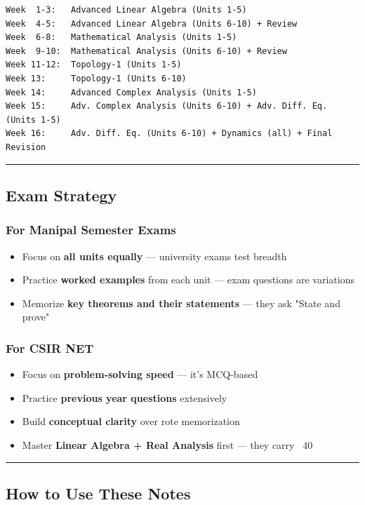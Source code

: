 \documentclass[12pt,a4paper,openany]{book}
\begin{document}
{\begin{verbatim}
Week  1-3:   Advanced Linear Algebra (Units 1-5)
Week  4-5:   Advanced Linear Algebra (Units 6-10) + Review
Week  6-8:   Mathematical Analysis (Units 1-5)
Week  9-10:  Mathematical Analysis (Units 6-10) + Review
Week 11-12:  Topology-1 (Units 1-5)
Week 13:     Topology-1 (Units 6-10)
Week 14:     Advanced Complex Analysis (Units 1-5)
Week 15:     Adv. Complex Analysis (Units 6-10) + Adv. Diff. Eq. (Units 1-5)
Week 16:     Adv. Diff. Eq. (Units 6-10) + Dynamics (all) + Final Revision
\end{verbatim}

\bigskip\noindent\rule{\textwidth}{0.4pt}\bigskip

\subsection{ Exam Strategy}

\subsubsection{For Manipal Semester Exams}
\begin{itemize}[leftmargin=*]
  \item Focus on \textbf{all units equally} — university exams test breadth
  \item Practice \textbf{worked examples} from each unit — exam questions are variations
  \item Memorize \textbf{key theorems and their statements} — they ask "State and prove"
\end{itemize}

\subsubsection{For CSIR NET}
\begin{itemize}[leftmargin=*]
  \item Focus on \textbf{problem-solving speed} — it's MCQ-based
  \item Practice \textbf{previous year questions} extensively
  \item Build \textbf{conceptual clarity} over rote memorization
  \item Master \textbf{Linear Algebra + Real Analysis} first — they carry ~40%
\end{itemize}

\bigskip\noindent\rule{\textwidth}{0.4pt}\bigskip

\subsection{ How to Use These Notes}

}
\end{document}

